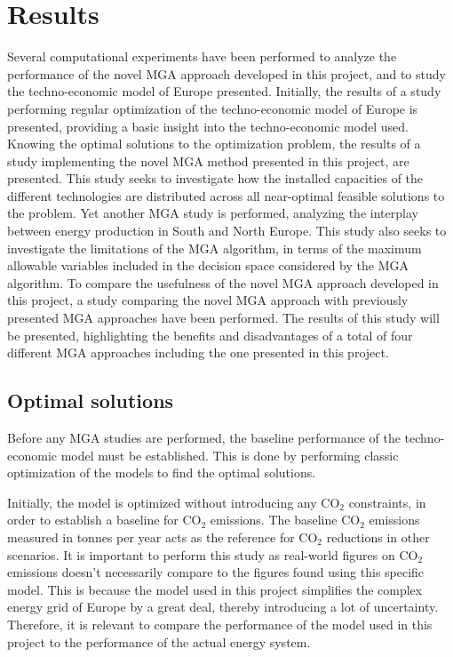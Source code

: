 
\chapter{Results}
Several computational experiments have been performed to analyze the performance of the novel MGA approach developed in this project, and to study the techno-economic model of Europe presented. Initially, the results of a study performing regular optimization of the techno-economic model of Europe is presented, providing a basic insight into the techno-economic model used. Knowing the optimal solutions to the optimization problem, the results of a study implementing the novel MGA method presented in this project, are presented. This study seeks to investigate how the installed capacities of the different technologies are distributed across all near-optimal feasible solutions to the problem.
Yet another MGA study is performed, analyzing the interplay between energy production in South and North Europe. This study also seeks to investigate the limitations of the MGA algorithm, in terms of the maximum allowable variables included in the decision space considered by the MGA algorithm. 
To compare the usefulness of the novel MGA approach developed in this project, a study comparing the novel MGA approach with previously presented MGA approaches have been performed. The results of this study will be presented, highlighting the benefits and disadvantages of a total of four different MGA approaches including the one presented in this project. 


\section{Optimal solutions}
Before any MGA studies are performed, the baseline performance of the techno-economic model must be established. This is done by performing classic optimization of the models to find the optimal solutions. 

Initially, the model is optimized without introducing any $\text{CO}_2$ constraints, in order to establish a baseline for $\text{CO}_2$ emissions. The baseline $\text{CO}_2$ emissions measured in tonnes per year acts as the reference for $\text{CO}_2$ reductions in other scenarios. It is important to perform this study as real-world figures on $\text{CO}_2$ emissions doesn't necessarily compare to the figures found using this specific model. This is because the model used in this project simplifies the complex energy grid of Europe by a great deal, thereby introducing a lot of uncertainty. Therefore, it is relevant to compare the performance of the model used in this project to the performance of the actual energy system. 


